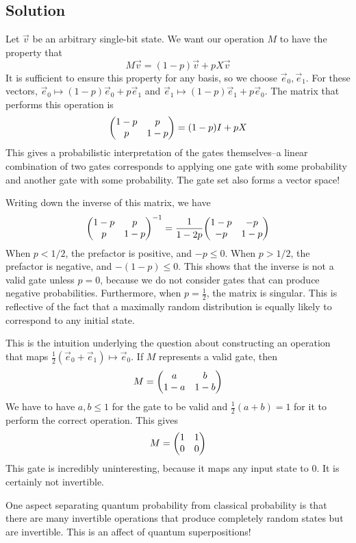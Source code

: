 \documentclass{article}
\begin{document}
\subsection*{Solution}
Let $\vec v$ be an arbitrary single-bit state. We want our operation $M$ to have the property that
$$
M \vec v = (1-p)\vec v + pX\vec v
$$
It is sufficient to ensure this property for any basis, so we choose $\vec e_0, \vec e_1$. For these vectors, $\vec e_0 \mapsto (1-p)\vec e_0 + p \vec e_1$ and $\vec e_1 \mapsto (1-p)\vec e_1 + p\vec e_0$. The matrix that performs this operation is
$$
\mqty(1-p & p \\ p & 1-p) = (1-p)I + pX
$$
This gives a probabilistic interpretation of the gates themselves--a linear combination of two gates corresponds to applying one gate with some probability and another gate with some probability. The gate set also forms a vector space!
\par Writing down the inverse of this matrix, we have
$$
\mqty(1-p & p \\ p & 1-p)^{-1} = \frac{1}{1-2p}\mqty(1-p & -p \\ -p & 1-p)
$$
When $p < 1/2$, the prefactor is positive, and $-p \leq 0$. When $p > 1/2$, the prefactor is negative, and $-(1-p) \leq 0$. This shows that the inverse is not a valid gate unless $p=0$, because we do not consider gates that can produce negative probabilities. Furthermore, when $p = \frac{1}{2}$, the matrix is singular. This is reflective of the fact that a maximally random distribution is equally likely to correspond to any initial state. 
\par This is the intuition underlying the question about constructing an operation that maps $\frac{1}{2}(\vec e_0+\vec e_1) \mapsto \vec e_0$. If $M$ represents a valid gate, then
$$
M = \mqty(a & b \\ 1-a & 1-b)
$$
We have to have $a, b \leq 1$ for the gate to be valid and $\frac{1}{2}(a+b) = 1$ for it to perform the correct operation. This gives
$$
M = \mqty(1 & 1 \\ 0 & 0)
$$
This gate is incredibly uninteresting, because it maps any input state to $0$. It is certainly not invertible.
\par One aspect separating quantum probability from classical probability is that there are many invertible operations that produce completely random states but are invertible. This is an affect of quantum superpositions!
\end{document}
